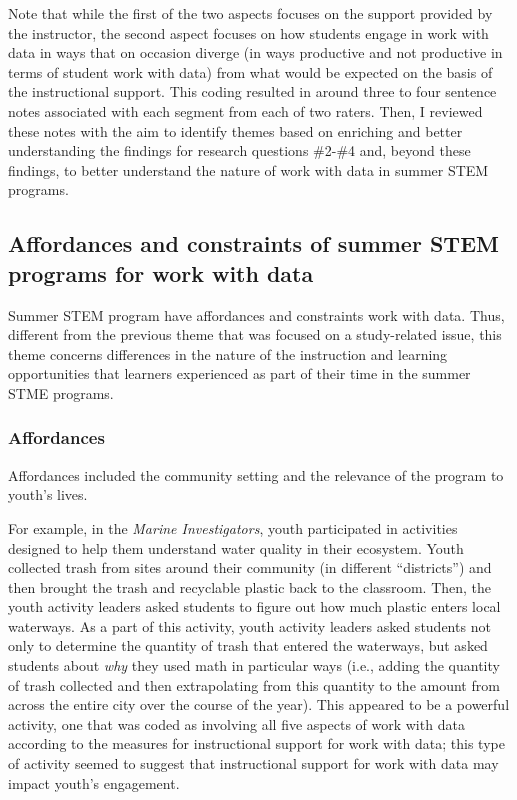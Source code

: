 \documentclass[]{msu-thesis}
\theoremstyle{definition}
\theoremstyle{definition}
\theoremstyle{definition}
\theoremstyle{remark}
\begin{document}
Note that while the first of the two aspects focuses on the support
provided by the instructor, the second aspect focuses on how students
engage in work with data in ways that on occasion diverge (in ways
productive and not productive in terms of student work with data) from
what would be expected on the basis of the instructional support. This
coding resulted in around three to four sentence notes associated with
each segment from each of two raters. Then, I reviewed these notes with
the aim to identify themes based on enriching and better understanding
the findings for research questions \#2-\#4 and, beyond these findings,
to better understand the nature of work with data in summer STEM
programs.

\subsection{Affordances and constraints of summer STEM programs for work
with
data}\label{affordances-and-constraints-of-summer-stem-programs-for-work-with-data}

Summer STEM program have affordances and constraints work with data.
Thus, different from the previous theme that was focused on a
study-related issue, this theme concerns differences in the nature of
the instruction and learning opportunities that learners experienced as
part of their time in the summer STME programs.

\subsubsection{Affordances}\label{affordances}

Affordances included the community setting and the relevance of the
program to youth's lives.

For example, in the \emph{Marine Investigators}, youth participated in
activities designed to help them understand water quality in their
ecosystem. Youth collected trash from sites around their community (in
different ``districts'') and then brought the trash and recyclable
plastic back to the classroom. Then, the youth activity leaders asked
students to figure out how much plastic enters local waterways. As a
part of this activity, youth activity leaders asked students not only to
determine the quantity of trash that entered the waterways, but asked
students about \emph{why} they used math in particular ways (i.e.,
adding the quantity of trash collected and then extrapolating from this
quantity to the amount from across the entire city over the course of
the year). This appeared to be a powerful activity, one that was coded
as involving all five aspects of work with data according to the
measures for instructional support for work with data; this type of
activity seemed to suggest that instructional support for work with data
may impact youth's engagement.
\end{document}

